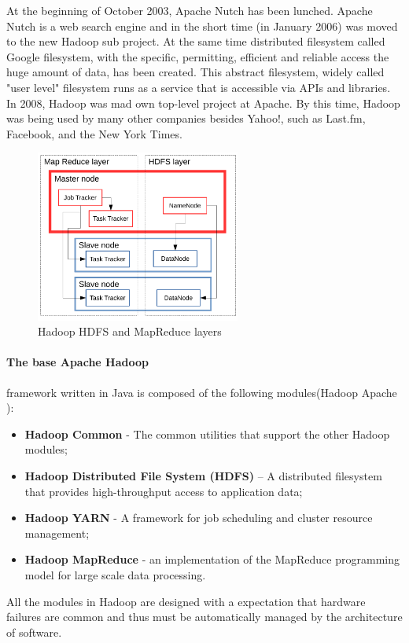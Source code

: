 \documentclass[a4paper,12pt,oneside]{report}
\begin{document}
	At the beginning of October 2003, Apache Nutch\cite{nutch_web} has been lunched.
	Apache Nutch is a  web search engine and in the short time (in January 2006) was
	moved to the new Hadoop sub project.
	At the same time  distributed filesystem called Google
	filesystem\cite{google_fs}, with the specific, permitting, efficient and
	reliable access
	the huge amount of data, has been created. This abstract filesystem, widely
	called "user level"
	filesystem runs as a service that is accessible via APIs and libraries. 
	In 2008, Hadoop was mad own top-level project at Apache.\cite{hadoop_web_news}
	By this time, Hadoop was being used by many
	other companies besides Yahoo!, such as Last.fm, Facebook, and the New York
	Times. 
	
	\begin{figure}[!htbp]
		\centering
		\includegraphics[width=0.6\textwidth]{./img/schema2.pdf}
		\caption[Hadoop architecture2]{\centering Hadoop HDFS and MapReduce layers}
	\end{figure} 
	
	
	
	\paragraph*{The base Apache Hadoop}framework written in Java is composed of the
	following modules(Hadoop Apache \cite{hadoop_web}):
	\begin{itemize}
		\item \textbf{Hadoop Common} - The common utilities that support the other
		Hadoop modules;
		\item \textbf{Hadoop Distributed File System (HDFS)} – A distributed filesystem
		that provides
		high-throughput access to application data;
		\item \textbf{Hadoop YARN} - A framework for job scheduling and cluster resource
		management;
		\item \textbf{Hadoop MapReduce} - an implementation of the MapReduce programming
		model 
		for large scale data processing.
	\end{itemize}
	All the modules in Hadoop are designed with a expectation that hardware failures
	are common and thus 
	must be automatically managed by the architecture of  software.
	
\end{document}
